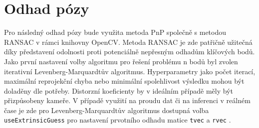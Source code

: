 \section{Odhad pózy}
\label{sec:Chapter43}
Pro následný odhad pózy bude využita metoda PnP společně s metodou RANSAC v rámci knihovny OpenCV. Metoda RANSAC je zde patřičně užitečná díky představení odolnosti proti potenciálně nepřesným odhadům klíčových bodů. Jako první nastavení volby algoritmu pro řešení problému n bodů byl zvolen iterativní Levenberg-Marquardtův algoritmus.  Hyperparametry jako počet iterací, maximální reprojekční chyba nebo minimální spolehlivost výsledku mohou být doladěny dle potřeby. Distorzní koeficienty by v ideálním případě měly být přizpůsobeny kameře. V případě využití na proudu dat či na inferenci v reálném čase je zde pro Levenberg-Marquardtův algoritmus dostupná volba \texttt{useExtrinsicGuess} pro nastavení prvotního odhadu matice \texttt{tvec} a \texttt{rvec} \cite{opencv_calib}.